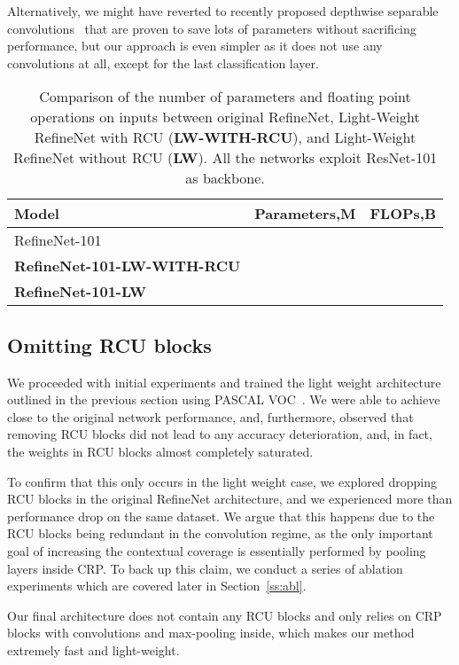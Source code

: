 \documentclass{bmvc2k}
\begin{document}
Alternatively, we might have reverted to recently proposed depthwise separable convolutions~\cite{Chollet17} that are proven to save lots of parameters without sacrificing performance, but our approach is even simpler as it does not use any  convolutions at all, except for the last classification layer.
	
\begin{table}
	\begin{center}
		\begin{tabular}{l|c|c}
			\hline Model & Parameters,M & FLOPs,B\\
\hline
RefineNet-101~\cite{LinMSR17} &  & \\
			\textbf{RefineNet-101-LW-WITH-RCU}  &  & \\
			\textbf{RefineNet-101-LW}  &  & \\
			\hline
		\end{tabular}
	\end{center}
	\caption{Comparison of the number of parameters and floating point operations on  inputs between original RefineNet, Light-Weight RefineNet with RCU (\textbf{LW-WITH-RCU}), and Light-Weight RefineNet without RCU (\textbf{LW}). All the networks exploit ResNet-101 as backbone.\label{table:r101}}
	\vskip -0.2in
\end{table}


\subsection{Omitting RCU blocks}
\label{rcu_red}
We proceeded with initial experiments and trained the light weight architecture outlined in the previous section using PASCAL VOC~\cite{EveringhamGWWZ10}. We were able to achieve close to the original network performance, and, furthermore, observed that removing RCU blocks did not lead to any accuracy deterioration, and, in fact, the weights in RCU blocks almost completely saturated.

To confirm that this only occurs in the light weight case, we explored dropping RCU blocks in the original RefineNet architecture, and we experienced more than  performance drop on the same dataset. We argue that this happens due to the RCU blocks being redundant in the  convolution regime, as the only important goal of increasing the contextual coverage is essentially performed by pooling layers inside CRP. To back up this claim, we conduct a series of ablation experiments which are covered later in Section~\ref{ss:abl}.

Our final architecture does not contain any RCU blocks and only relies on CRP blocks with  convolutions and  max-pooling inside, which makes our method extremely fast and light-weight.
    
\end{document}
